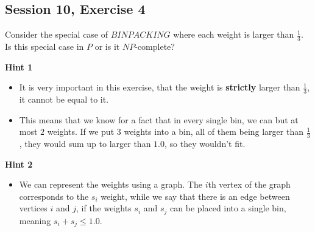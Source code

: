 \subsection {Session 10, Exercise 4}


Consider the special case of $BINPACKING$ where each weight is larger than $\frac{1}{3}$. Is this special case in $P$ or is it $NP$-complete?


\textbf{Hint 1}

\begin{itemize}
    \item It is very important in this exercise, that the weight is \textbf{strictly} larger than $\frac{1}{3}$, it cannot be equal to it.
    \item This means that we know for a fact that in every single bin, we can but at most $2$ weights. If we put $3$ weights into a bin, all of them being larger than $\frac{1}{3}$, they would sum up to larger than $1.0$, so they wouldn't fit.
\end{itemize}

\textbf{Hint 2}

\begin{itemize}
    \item We can represent the weights using a graph. The $i$th vertex of the graph corresponds to the $s_i$ weight, while we say that there is an edge between vertices $i$ and $j$, if the weights $s_i$ and $s_j$ can be placed into a single bin, meaning $s_i+s_j\leq{}1.0$.
\end{itemize}

